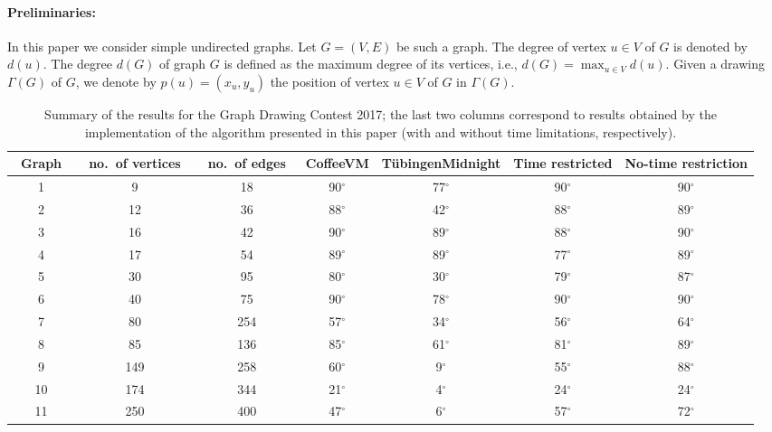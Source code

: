 \documentclass{comjnl}
\begin{document}
\paragraph{Preliminaries:}
In this paper we consider simple undirected graphs. Let $G=(V,E)$ be such a graph. The degree of vertex $u\in V$ of $G$ is denoted by $d(u)$. The degree $d(G)$ of  graph $G$ is defined as the maximum degree of its vertices, i.e., $d(G)=\max_{u\in V}d(u)$. Given a drawing $\Gamma(G)$ of $G$, we denote by $p(u)=(x_u,y_u)$ the position of vertex $u \in V$ of $G$ in $\Gamma(G)$. 


\begin{table}
\caption{Summary of the results for the Graph Drawing Contest 2017; the last two columns correspond to results obtained by the implementation of the algorithm presented in this paper (with and without time limitations, respectively).}
\centering
\begin{adjustbox}{width=1\textwidth}
\begin{tabular}{c|c|c|c|c|c|c}
\toprule
\rowcolor{gray!30!}~Graph~ & ~no.~of vertices~ & ~no.~of edges~ & CoffeeVM & T\"ubingenMidnight & Time restricted & No-time restriction \\
\midrule
\rowcolor{gray!30!} 1  &  9  & 18    & 90$^\circ$ & 77$^\circ$ & 90$^\circ$ & 90$^\circ$\\
\rowcolor{gray!00!} 2  & 12  & 36    & 88$^\circ$ & 42$^\circ$ & 88$^\circ$ & 89$^\circ$\\
\rowcolor{gray!30!} 3  & 16  & 42    & 90$^\circ$ & 89$^\circ$ & 88$^\circ$ & 90$^\circ$\\
\rowcolor{gray!00!} 4  & 17  & 54    & 89$^\circ$ & 89$^\circ$ & 77$^\circ$ & 89$^\circ$\\
\rowcolor{gray!30!} 5  & 30  & 95    & 80$^\circ$ & 30$^\circ$ & 79$^\circ$ & 87$^\circ$\\
\rowcolor{gray!00!} 6  & 40  & 75    & 90$^\circ$ & 78$^\circ$ & 90$^\circ$ & 90$^\circ$\\
\rowcolor{gray!30!} 7  & 80  & 254   & 57$^\circ$ & 34$^\circ$ & 56$^\circ$ & 64$^\circ$\\
\rowcolor{gray!00!} 8  & 85  & 136   & 85$^\circ$ & 61$^\circ$ & 81$^\circ$ & 89$^\circ$\\
\rowcolor{gray!30!} 9  & 149 & 258   & 60$^\circ$ & 9$^\circ$  & 55$^\circ$ & 88$^\circ$\\
\rowcolor{gray!00!} 10 & 174 & 344   & 21$^\circ$ & 4$^\circ$  & 24$^\circ$ & 24$^\circ$\\
\rowcolor{gray!30!} 11 & 250 & 400   & 47$^\circ$ & 6$^\circ$  & 57$^\circ$ & 72$^\circ$\\

\end{tabular}
\end{adjustbox}
\end{table}
\end{document}

